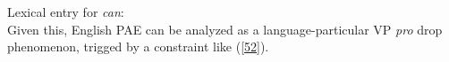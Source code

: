 {%
\ea
\label{51}
Lexical entry for \textit{can}:\\
\z
%
%
Given this, English PAE can be analyzed as a language-particular VP \textit{pro} drop phenomenon, trigged
by a constraint like (\ref{52}).



}
